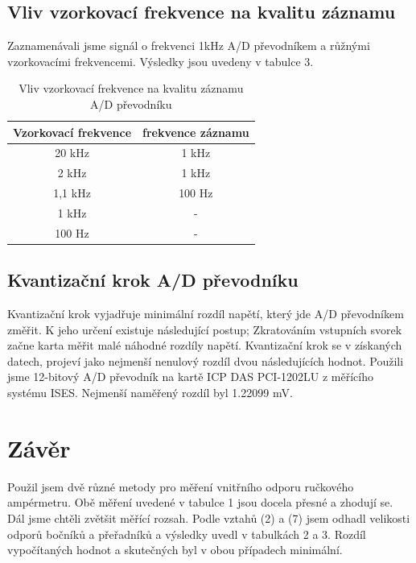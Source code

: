 \documentclass[a4paper,11pt]{article}
\begin{document}
\subsection{Vliv vzorkovací frekvence na kvalitu záznamu}

Zaznamenávali jsme signál o frekvenci 1kHz A/D převodníkem a růžnými vzorkovacími frekvencemi. Výsledky jsou uvedeny v tabulce 3.

\begin{table}[htpb]
  \centering
  \begin{tabular}{ | c | c | }
    \hline
    Vzorkovací frekvence & frekvence záznamu \\\hline
    20 kHz & 1 kHz \\
    2 kHz & 1 kHz \\
    1,1 kHz & 100 Hz \\
    1 kHz & - \\
    100 Hz & - \\\hline
  \end{tabular}
  \caption{Vliv vzorkovací frekvence na kvalitu záznamu A/D převodníku}
\end{table}

\subsection{Kvantizační krok A/D převodníku}

Kvantizační krok vyjadřuje minimální rozdíl napětí, který jde A/D převodníkem změřit. 
K jeho určení existuje následující postup; Zkratováním vstupních svorek začne karta měřit malé náhodné rozdíly napětí. Kvantizační krok se v získaných datech, projeví jako nejmenší nenulový rozdíl dvou následujících hodnot. Použili jsme 12-bitový A/D převodník na kartě ICP DAS PCI-1202LU z měřícího systému ISES. Nejmenší naměřený rozdíl byl 1.22099 mV.

\newpage

\section{Závěr}

Použil jsem dvě různé metody pro měření vnitřního odporu ručkového ampérmetru. Obě měření uvedené v tabulce 1 jsou docela přesné a zhodují se. Dál jsme chtěli zvětšit měřící rozsah. Podle vztahů (2) a (7) jsem odhadl velikosti odporů bočníků a přeřadníků a výsledky uvedl v tabulkách 2 a 3. Rozdíl vypočítaných hodnot a skutečných byl v obou případech minimální. \\
\end{document}
